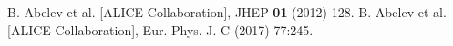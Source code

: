 \begin{thebibliography}{99}
 B. Abelev et al. [ALICE Collaboration], JHEP {\bf 01} (2012) 128.
 B. Abelev et al. [ALICE Collaboration], Eur. Phys. J. C (2017) 77:245.
\end{thebibliography} 